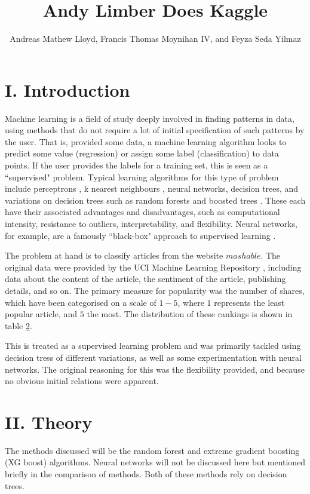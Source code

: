 \documentclass[onecolumn,prl,aps,10pt]{revtex4}
\begin{document}
\title{Andy Limber Does Kaggle}
\author{Andreas Mathew Lloyd, Francis Thomas Moynihan IV, and Feyza Seda Yilmaz}
\maketitle

\section{I. Introduction}
Machine learning is a field of study deeply involved in finding patterns in data, using methods that do not require a lot of initial specification of such patterns by the user. That is, provided some data, a machine learning algorithm looks to predict some value (regression) or assign some label (classification) to data points. If the user provides the labels for a training set, this is seen as a \textquotedblleft supervised" problem. Typical learning algorithms for this type of problem include perceptrons \cite{keylist}, k nearest neighbours \cite{keylist}, neural networks, decision trees, and variations on decision trees such as random forests \cite{keylist} and boosted trees \cite{keylist}. These each have their associated advantages and disadvantages, such as computational intensity, resistance to outliers, interpretability, and flexibility. Neural networks, for example, are a famously \textquotedblleft black-box" approach to supervised learning \cite{keylist}.

The problem at hand is to classify articles from the website $mashable$. The original data were provided by the UCI Machine Learning Repository \cite{keylist}, including data about the content of the article, the sentiment of the article, publishing details, and so on. The primary measure for popularity was the number of shares, which have been categorised on a scale of $1 - 5$, where $1$ represents the least popular article, and $5$ the most. The distribution of these rankings is shown in table \ref{}.

This is treated as a supervised learning problem and was primarily tackled using decision tress of different variations, as well as some experimentation with neural networks. The original reasoning for this was the flexibility provided, and because no obvious initial relations were apparent.

\section{II. Theory}
The methods discussed will be the random forest and extreme gradient boosting (XG boost) algorithms. Neural networks will not be discussed here but mentioned briefly in the comparison of methods. Both of these methods rely on decision trees. 
\end{document}
